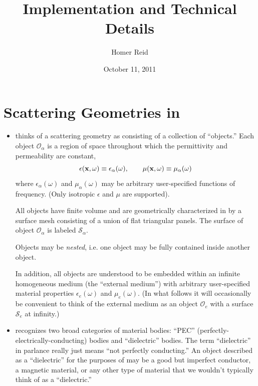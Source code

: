 \documentclass[letterpaper]{article}
\title {\lss Implementation and Technical Details}
\author {Homer Reid}
\date {October 11, 2011}
\begin{document}
\pagestyle{myheadings}
\maketitle

\tableofcontents

\newpage
\section{Scattering Geometries in \lss}

\begin{itemize}

\item
\lss thinks of a scattering geometry as consisting of a collection
of ``objects.'' Each object $\mathcal{O}_\alpha$ is a region of
space throughout which the permittivity and permeability are constant,
$$ \epsilon(\mathbf{x}, \omega) \equiv \epsilon_\alpha(\omega), \qquad
   \mu(\mathbf{x}, \omega)      \equiv \mu_\alpha(\omega)
$$
where $\epsilon_\alpha(\omega)$ and $\mu_\alpha(\omega)$ may
be arbitrary user-specified functions of frequency. 
(Only isotropic $\epsilon$ and $\mu$ are supported).

All objects have finite volume and are geometrically characterized 
in \lss by a surface mesh consisting of a union of flat triangular
panels. The surface of object $\mathcal{O}_\alpha$ is labeled 
$\mathcal{S}_\alpha$.

Objects may be \textit{nested}, i.e. one object may be 
fully contained inside another object. 

In addition, all objects are understood to be embedded within an 
infinite homogeneous medium (the ``external medium'') with 
arbitrary user-specified material properties 
$\epsilon_e(\omega)$ and $\mu_e(\omega)$. (In what follows it
will occasionally be convenient to think of the external
medium as an object $\mathcal{O}_e$ with a surface $\mathcal{S}_e$
at infinity.)

\item
\lss recognizes two broad categories of material bodies:
``PEC'' (perfectly-electrically-conducting) bodies and
``dielectric'' bodies. 
The term ``dielectric'' in \lss parlance really just means
``not perfectly conducting.'' An object described as a ``dielectric''
for the purposes of \lss may be a good but imperfect conductor,
a magnetic material, or any other type of material that we wouldn't
typically think of as a ``dielectric.''


\end{itemize}
\end{document}
